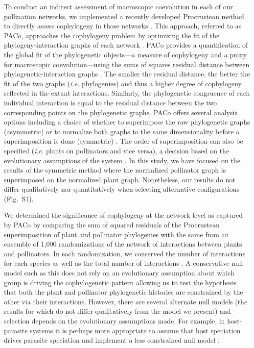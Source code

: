 \documentclass{article}
\begin{document}
	To conduct an indirect assessment of macroscopic coevolution in each of our pollination networks, we implemented a recently developed Procrustean method to directly assess cophylogeny in those networks \citep{Balbuena2013}. This approach, referred to as PACo, approaches the cophylogeny problem by optimizing the fit of the phylogeny-interaction graphs of each network \citep{Balbuena2013, Cagua2015}. PACo provides a quantification of the global fit of the phylogenetic objects---a measure of cophylogeny and a proxy for macroscopic coevolution---using the sums of squares residual distance between phylogenetic-interaction graphs \citep{Balbuena2013, Cagua2015}. The smaller the residual distance, the better the fit of the two graphs (\emph{i.e.} phylogenies) and thus a higher degree of cophylogeny reflected in the extant interactions. Similarly, the phylogenetic congruence of each individual interaction is equal to the residual distance between the two corresponding points on the phylogenetic graphs. PACo offers several analysis options including a choice of whether to superimpose the raw phylogenetic graphs (asymmetric) or to normalize both graphs to the same dimensionality before a superimposition is done (symmetric) \citep{Balbuena2013}. The order of superimposition can also be specified (\emph{i.e.} plants on pollinators and vice versa), a decision based on the evolutionary assumptions of the system \citep{Balbuena2013}. In this study, we have focused on the results of the symmetric method where the normalized pollinator graph is superimposed on the normalized plant graph. Nonetheless, our results do not differ qualitatively nor quantitatively when selecting alternative configurations (Fig.\ S1).
	
	We determined the significance of cophylogeny at the network level as captured by PACo by comparing the sum of squared residuals of the Procrustean superimposition of plant and pollinator phylogenies with the same from an ensemble of 1,000 randomizations of the network of interactions between plants and pollinators. In each randomization, we conserved the number of interactions for each species as well as the total number of interactions \citep{Fortuna2010}. A conservative null model such as this does not rely on an evolutionary assumption about which group is driving the cophylogenetic pattern allowing us to test the hypothesis that both the plant and pollinator phylogenetic histories are constrained by the other via their interactions. However, there are several alternate null models (the results for which do not differ qualitatively from the model we present) and selection depends on the evolutionary assumptions made. For example, in host-parasite systems it is perhaps more appropriate to assume that host speciation drives parasite speciation and implement a less constrained null model \citep{Balbuena2013}.
	
\end{document}
